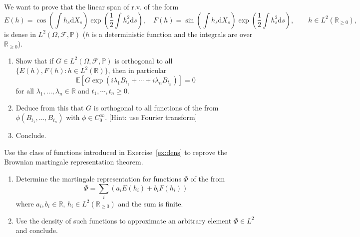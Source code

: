 \documentclass{article}
\newcommand{\mathd}{\mathrm{d}}
\newenvironment{enumeratealpha}{\begin{enumerate}[a{\textup{)}}] }{\end{enumerate}}
{\theorembodyfont{\rmfamily\small}\newtheorem{exercise}{Exercise}}
\begin{document}
\begin{exercise}[Pts 2+2+2]
  \label{ex:dens} We want to prove that the linear span of r.v. of
  the form
  \[ E (h) = \cos \left( \int h_s \mathd X_s \right) \exp \left( \frac{1}{2}
     \int h_s^2 \mathd s \right), \quad F (h) = \sin \left( \int h_s \mathd
     X_s \right) \exp \left( \frac{1}{2} \int h_s^2 \mathd s \right), \qquad h
     \in L^2 (\mathbb{R}_{\geqslant 0}), \]
  is dense in $L^2 (\Omega, \mathcal{F}, \mathbb{P})$ ($h$ is a deterministic
  function and the integrals are over $\mathbb{R}_{\geqslant 0}$).
  \begin{enumeratealpha}
    \item Show that if $G \in L^2 (\Omega, \mathcal{F}, \mathbb{P})$ is
    orthogonal to all $\{ E (h), F (h) : h \in L^2 (\mathbb{R}) \}$, then in
    particular
    \[ \mathbb{E} [G \exp (i \lambda_1 B_{t_1} + \cdots + i \lambda_n
       B_{t_n})] = 0 \]
    for all $\lambda_1, \ldots, \lambda_n \in \mathbb{R}$ and $t_1, \cdots,
    t_n \geqslant 0$.
    
    \item Deduce from this that $G$ is orthogonal to all functions of the from
    $\phi (B_{t_1}, \ldots, B_{t_n})$ with $\phi \in C_0^{\infty}$. [Hint: use
    Fourier transform]
    
    \item Conclude.
  \end{enumeratealpha}
\end{exercise}

\hrulefill

\begin{exercise}
  [Pts 4+4] Use the class of functions introduced in Exercise~\ref{ex:dens} to
  reprove the Brownian martingale representation theorem.
  \begin{enumeratealpha}
    \item Determine the martingale representation for functions $\Phi$ of the
    from
    \[ \Phi = \sum_i (a_i E (h_i) + b_i F (h_i)) \]
    where $a_i, b_i \in \mathbb{R}$, $h_i \in L^2 (\mathbb{R}_{\geqslant 0})$
    and the sum is finite.
    
    \item Use the density of such functions to approximate an arbitrary
    element $\Phi \in L^2$ and conclude.
  \end{enumeratealpha}
\end{exercise}

\

\hrulefill

\
\end{document}

